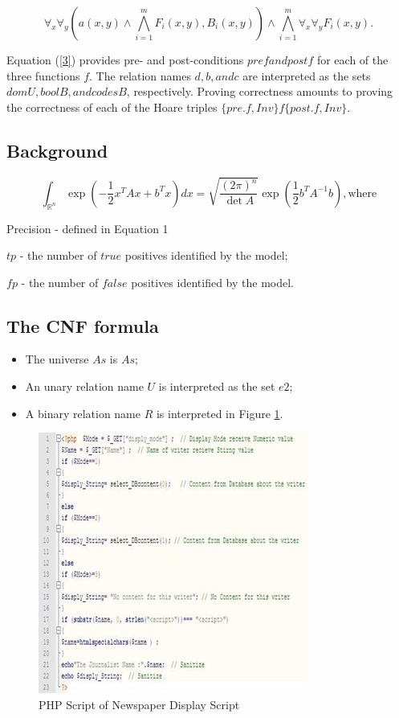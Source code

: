 \documentclass[12pt]{acmart}
\begin{document}
\begin{equation}
    \forall_x \forall_y (a(x,y) \wedge \bigwedge_{i=1}^mF_i(x,y), B_i(x,y)) \wedge \bigwedge_{i=1}^m \forall_x \forall_y F_i(x,y).
    \label{2}
\end{equation}
 
 Equation (\ref{3}) provides pre- and post-conditions $pref and postf$ for each of the three functions $f$. The relation names $d, b, and c$ are interpreted as the sets $domU   , boolB, and codesB$, respectively. Proving correctness amounts to proving the correctness of each of the Hoare triples $\{pre.f, Inv\}  f  \{post.f, Inv\}$.

\subsection{Background}

\begin{equation}
    \int_{\mathbb{R}^n} \exp\left( -\frac{1}{2} x^T A x + b^T x \right) dx = \sqrt{\frac{(2\pi)^n}{\det A}} \exp\left( \frac{1}{2} b^T A^{-1} b \right),
    \text{where}
    \label{3}
\end{equation}

Precision - defined in Equation 1\par
    $tp$ - the number of $true$ positives identified by the model;\par
	$fp$ - the number of $false$ positives identified by the model.

\subsection{The CNF formula}

\begin{itemize}
    \item The universe $As$ is $As$;
    \item An unary relation name $U$ is interpreted as the set $e2$;
    \item A binary relation name $R$ is interpreted in Figure \ref{pic2}.
\end{itemize}

\begin{figure}[H]
    \centering
    \includegraphics{Picture2.jpg}
    \caption{PHP Script of Newspaper Display Script}
    \label{pic2}
\end{figure}
\end{document}
